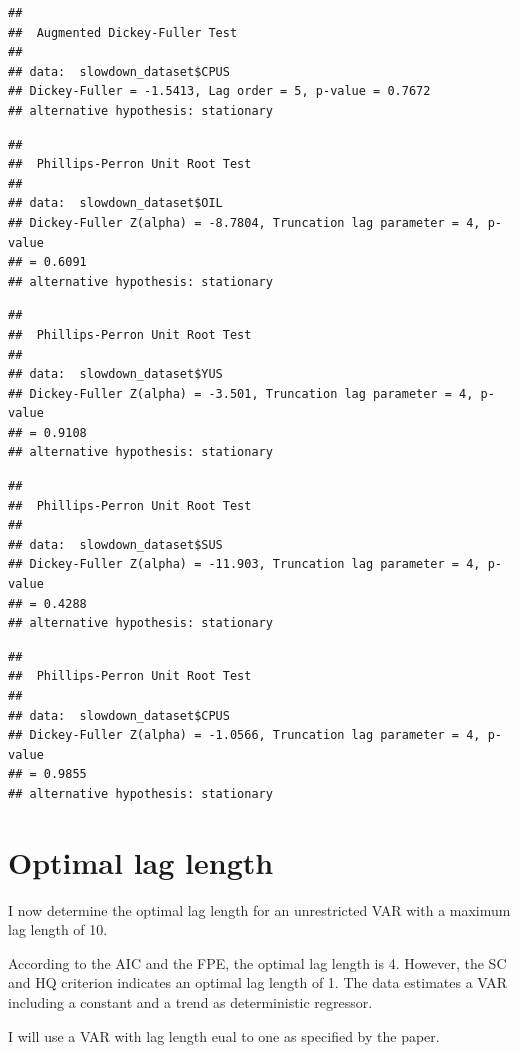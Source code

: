 \documentclass[11pt,preprint, authoryear]{elsarticle}
\numberwithin{equation}{section}
\numberwithin{figure}{section}
\numberwithin{table}{section}
\begin{document}
\begin{verbatim}
## 
##  Augmented Dickey-Fuller Test
## 
## data:  slowdown_dataset$CPUS
## Dickey-Fuller = -1.5413, Lag order = 5, p-value = 0.7672
## alternative hypothesis: stationary
\end{verbatim}

\begin{verbatim}
## 
##  Phillips-Perron Unit Root Test
## 
## data:  slowdown_dataset$OIL
## Dickey-Fuller Z(alpha) = -8.7804, Truncation lag parameter = 4, p-value
## = 0.6091
## alternative hypothesis: stationary
\end{verbatim}

\begin{verbatim}
## 
##  Phillips-Perron Unit Root Test
## 
## data:  slowdown_dataset$YUS
## Dickey-Fuller Z(alpha) = -3.501, Truncation lag parameter = 4, p-value
## = 0.9108
## alternative hypothesis: stationary
\end{verbatim}

\begin{verbatim}
## 
##  Phillips-Perron Unit Root Test
## 
## data:  slowdown_dataset$SUS
## Dickey-Fuller Z(alpha) = -11.903, Truncation lag parameter = 4, p-value
## = 0.4288
## alternative hypothesis: stationary
\end{verbatim}

\begin{verbatim}
## 
##  Phillips-Perron Unit Root Test
## 
## data:  slowdown_dataset$CPUS
## Dickey-Fuller Z(alpha) = -1.0566, Truncation lag parameter = 4, p-value
## = 0.9855
## alternative hypothesis: stationary
\end{verbatim}

\hypertarget{optimal-lag-length}{%
\section{Optimal lag length}\label{optimal-lag-length}}

I now determine the optimal lag length for an unrestricted VAR with a
maximum lag length of 10.

According to the AIC and the FPE, the optimal lag length is 4. However,
the SC and HQ criterion indicates an optimal lag length of 1. The data
estimates a VAR including a constant and a trend as deterministic
regressor.

I will use a VAR with lag length eual to one as specified by the paper.
\end{document}
